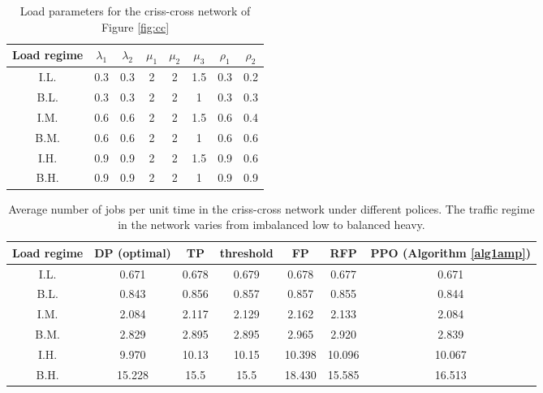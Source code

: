 \documentclass[11pt]{article}
\theoremstyle{definition}
\numberwithin{equation}{section}
\begin{document}
\begin{table}[H]
\centering
\begin{tabular}{|c|c|c|c|c|c|c|c|}
  \hline
  Load regime  & $\lambda_1$ & $\lambda_2 $ & $\mu_1$ & $\mu_2$ & $\mu_3$ & $\rho_1$ & $\rho_2$\\\hline
  I.L. & 0.3 & 0.3& 2 & 2 &1.5& 0.3&0.2\\\hline
  B.L. & 0.3 & 0.3 & 2 & 2 &1 &0.3&0.3\\\hline
  I.M. & 0.6 & 0.6  & 2 & 2 &1.5& 0.6&0.4\\\hline
  B.M. & 0.6 & 0.6  & 2 & 2 &1& 0.6&0.6\\\hline
  I.H. & 0.9 & 0.9 & 2 & 2 &1.5& 0.9&0.6\\\hline
  B.H. & 0.9 & 0.9 & 2 & 2&1&0.9&0.9 \\

  \hline


\end{tabular}
 \caption[]{Load parameters for the criss-cross network of Figure \ref{fig:cc}
 }\label{t:lp}
\end{table}



\begin{table}[H]
\centering
\begin{tabular}{|c|c|c|c|c|c|c|}
  \hline
  Load regime  & DP (optimal) & TP & threshold & FP & RFP & PPO (Algorithm \ref{alg1amp})\\\hline
  I.L. & 0.671 & 0.678 & 0.679 & 0.678 &0.677&   0.671 \\\hline
  B.L. & 0.843 & 0.856 & 0.857 & 0.857 &0.855&  0.844 \\\hline
  I.M. & 2.084 & 2.117 & 2.129 & 2.162 &2.133& 2.084  \\\hline
  B.M. & 2.829 & 2.895 & 2.895 & 2.965 &2.920 &  2.839\\\hline
  I.H. & 9.970 & 10.13 & 10.15 & 10.398 &10.096 & 10.067 \\\hline
  B.H. & 15.228 & 15.5 & 15.5 & 18.430 &15.585&  16.513\\

  \hline


\end{tabular}

 \caption[]{Average number of jobs per unit time in the criss-cross network under different polices. The traffic regime in the network varies from imbalanced low to balanced heavy.}\label{tab:cc}%
\end{table}
\end{document}
